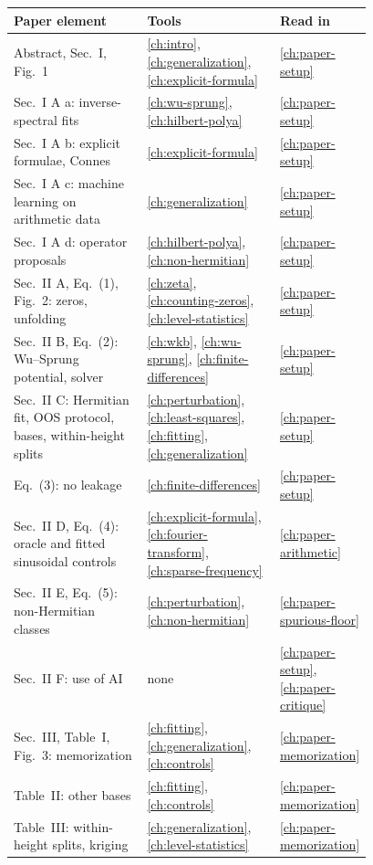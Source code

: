 \begin{center}\small
\begin{tabular}{p{0.40\linewidth}p{0.38\linewidth}l}
\toprule
Paper element & Tools & Read in\\
\midrule
Abstract, Sec.~I, Fig.~1 & \ref{ch:intro}, \ref{ch:generalization}, \ref{ch:explicit-formula} & \ref{ch:paper-setup}\\
Sec.~I A a: inverse-spectral fits & \ref{ch:wu-sprung}, \ref{ch:hilbert-polya} & \ref{ch:paper-setup}\\
Sec.~I A b: explicit formulae, Connes & \ref{ch:explicit-formula} & \ref{ch:paper-setup}\\
Sec.~I A c: machine learning on arithmetic data & \ref{ch:generalization} & \ref{ch:paper-setup}\\
Sec.~I A d: operator proposals & \ref{ch:hilbert-polya}, \ref{ch:non-hermitian} & \ref{ch:paper-setup}\\
Sec.~II A, Eq.~(1), Fig.~2: zeros, unfolding & \ref{ch:zeta}, \ref{ch:counting-zeros}, \ref{ch:level-statistics} & \ref{ch:paper-setup}\\
Sec.~II B, Eq.~(2): Wu--Sprung potential, solver & \ref{ch:wkb}, \ref{ch:wu-sprung}, \ref{ch:finite-differences} & \ref{ch:paper-setup}\\
Sec.~II C: Hermitian fit, OOS protocol, bases, within-height splits & \ref{ch:perturbation}, \ref{ch:least-squares}, \ref{ch:fitting}, \ref{ch:generalization} & \ref{ch:paper-setup}\\
Eq.~(3): no leakage & \ref{ch:finite-differences} & \ref{ch:paper-setup}\\
Sec.~II D, Eq.~(4): oracle and fitted sinusoidal controls & \ref{ch:explicit-formula}, \ref{ch:fourier-transform}, \ref{ch:sparse-frequency} & \ref{ch:paper-arithmetic}\\
Sec.~II E, Eq.~(5): non-Hermitian classes & \ref{ch:perturbation}, \ref{ch:non-hermitian} & \ref{ch:paper-spurious-floor}\\
Sec.~II F: use of AI & none & \ref{ch:paper-setup}, \ref{ch:paper-critique}\\
Sec.~III, Table~I, Fig.~3: memorization & \ref{ch:fitting}, \ref{ch:generalization}, \ref{ch:controls} & \ref{ch:paper-memorization}\\
Table~II: other bases & \ref{ch:fitting}, \ref{ch:controls} & \ref{ch:paper-memorization}\\
Table~III: within-height splits, kriging & \ref{ch:generalization}, \ref{ch:level-statistics} & \ref{ch:paper-memorization}\\

\end{tabular}
\end{center}
